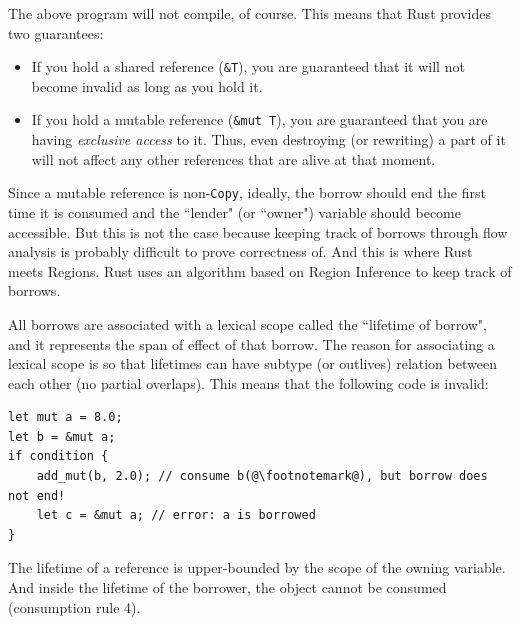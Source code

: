 \documentclass[11pt]{report}
\begin{document}
The above program will not compile, of course. This means that Rust provides two guarantees:

\begin{itemize}
\item If you hold a shared reference (\texttt{\&T}), you are guaranteed that it will not become invalid as long as you hold it.\footnotemark
\item If you hold a mutable reference (\texttt{\&mut T}), you are guaranteed that you are having \textit{exclusive access} to it. Thus, even destroying (or rewriting) a part of it will not affect any other references that are alive at that moment.
\end{itemize}

Since a mutable reference is non-\texttt{Copy}, ideally, the borrow should end the first time it is consumed and the ``lender" (or ``owner") variable should become accessible. But this is not the case because keeping track of borrows through flow analysis is probably difficult to prove correctness of. And this is where Rust meets Regions. Rust uses an algorithm based on Region Inference to keep track of borrows.

All borrows are associated with a lexical scope called the ``lifetime of borrow", and it represents the span of effect of that borrow. The reason for associating a lexical scope is so that lifetimes can have subtype (or outlives) relation between each other (no partial overlaps). This means that the following code is invalid:

\begin{lstlisting}
let mut a = 8.0;
let b = &mut a;
if condition {
    add_mut(b, 2.0); // consume b(@\footnotemark@), but borrow does not end!
    let c = &mut a; // error: a is borrowed
}
\end{lstlisting}

The lifetime of a reference is upper-bounded by the scope of the owning variable. And inside the lifetime of the borrower, the object cannot be consumed (consumption rule 4).
\end{document}
